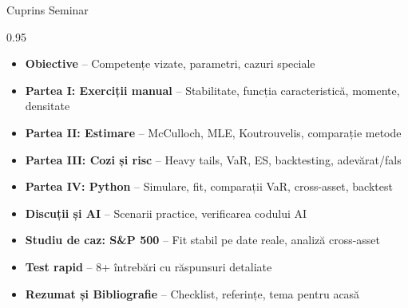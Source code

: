 \documentclass[9pt, aspectratio=169, t]{beamer}
\subtitle{Seminar 3: Distribuții Stabile}
\begin{document}
{
\begin{frame}
    \titlepage
\end{frame}
}

\begin{frame}{Cuprins Seminar}
    \begin{cminipage}{0.95\textwidth}
    \begin{itemize}\setlength{\itemsep}{0pt}
        \item \textbf{Obiective} -- Competențe vizate, parametri, cazuri speciale
        \vspace{0.1cm}
        \item \textbf{Partea I: Exerciții manual} -- Stabilitate, funcția caracteristică, momente, densitate
        \vspace{0.1cm}
        \item \textbf{Partea II: Estimare} -- McCulloch, MLE, Koutrouvelis, comparație metode
        \vspace{0.1cm}
        \item \textbf{Partea III: Cozi și risc} -- Heavy tails, VaR, ES, backtesting, adevărat/fals
        \vspace{0.1cm}
        \item \textbf{Partea IV: Python} -- Simulare, fit, comparații VaR, cross-asset, backtest
        \vspace{0.1cm}
        \item \textbf{Discuții și AI} -- Scenarii practice, verificarea codului AI
        \vspace{0.1cm}
        \item \textbf{Studiu de caz: S\&P 500} -- Fit stabil pe date reale, analiză cross-asset
        \vspace{0.1cm}
        \item \textbf{Test rapid} -- 8+ întrebări cu răspunsuri detaliate
        \vspace{0.1cm}
        \item \textbf{Rezumat și Bibliografie} -- Checklist, referințe, tema pentru acasă
    \end{itemize}
    \end{cminipage}
\end{frame}
\end{document}
